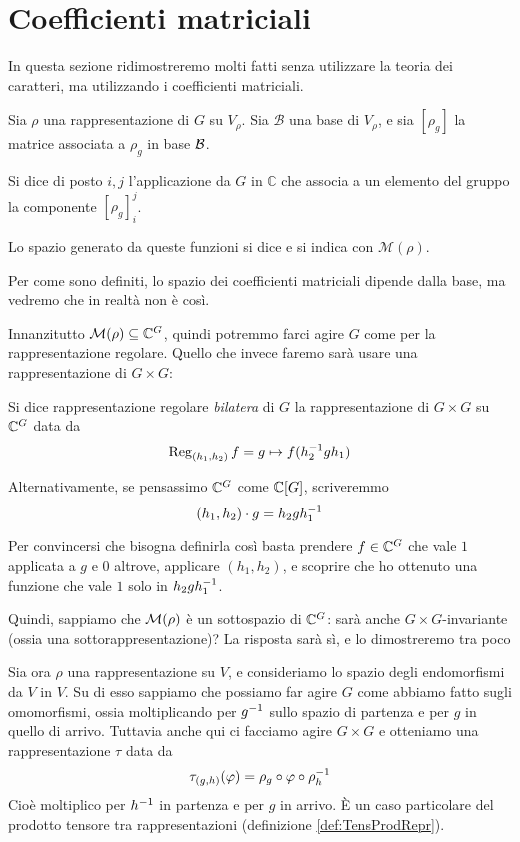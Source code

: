 \section{Coefficienti matriciali}\label{sec:MatEl}
	In questa sezione ridimostreremo molti fatti senza utilizzare la teoria dei caratteri, ma utilizzando i coefficienti matriciali.
	
	\begin{mydef}
		Sia $\rho$ una rappresentazione di $G$ su $V_\rho$. Sia $\mathcal B$ una base di $V_\rho$, e sia $[\rho_g]$ la matrice associata a $\rho_g$ in base $\mathcal B$.
		
		Si dice  di posto $i,j$ l'applicazione da $G$ in $\mathbb C$ che associa a un elemento del gruppo la componente $[\rho_g]_i^j$.
		
		Lo spazio generato da queste funzioni si dice  e si indica con $\mathcal M(\rho)$.
	\end{mydef}
	
	Per come sono definiti, lo spazio dei coefficienti matriciali dipende dalla base, ma vedremo che in realtà non è così.
	
	Innanzitutto $\mathcal M(\rho) \subseteq \mathbb C^{G}$, quindi potremmo farci agire $G$ come per la rappresentazione regolare. Quello che invece faremo sarà usare una rappresentazione di $G\times G$:
	
	\begin{mydef}\label{def:BilReg}
		Si dice rappresentazione regolare \emph{bilatera} di $G$ la rappresentazione di $G \times G$ su $\mathbb C^{G}$ data da
		\[
			\operatorname{Reg}_{(h_1,h_2)}f = g \mapsto f(h_2^{-1} g h_1)
		\]
		
		Alternativamente, se pensassimo $\mathbb C^{G}$ come $\mathbb C[G]$, scriveremmo
		\[
			(h_1,h_2)\cdot g = h_2gh_1^{-1}
		\]

	\end{mydef}
	Per convincersi che bisogna definirla così basta prendere $f\in\mathbb C^{G}$ che vale $1$ applicata a $g$ e $0$ altrove, applicare $(h_1,h_2)$, e scoprire che ho ottenuto una funzione che vale $1$ solo in $h_2gh_1^{-1}$.
	
	Quindi, sappiamo che $\mathcal M(\rho)$ è un sottospazio di $\mathbb C^{G}$: sarà anche $G\times G$-invariante (ossia una sottorappresentazione)? La risposta sarà sì, e lo dimostreremo tra poco

	Sia ora $\rho$ una rappresentazione su $V$, e consideriamo lo spazio degli endomorfismi da $V$ in $V$. Su di esso sappiamo che possiamo far agire $G$ come abbiamo fatto sugli omomorfismi, ossia moltiplicando per $g^{-1}$ sullo spazio di partenza e per $g$ in quello di arrivo. Tuttavia anche qui ci facciamo agire $G\times G$ e otteniamo una rappresentazione $\tau$ data da
	\[
		\tau_{(g,h)} (\varphi) = \rho_g \circ \varphi \circ \rho_h^{-1}
	\]
	Cioè moltiplico per $h^{-1}$ in partenza e per $g$ in arrivo. \`E un caso particolare del prodotto tensore tra rappresentazioni (definizione \ref{def:TensProdRepr}).
	
